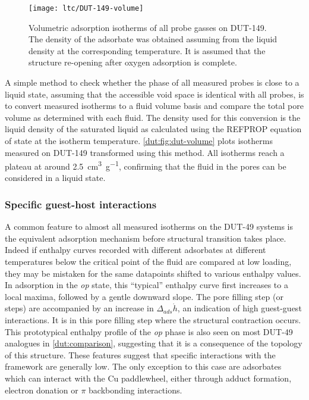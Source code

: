 \begin{figure}[htb]
    \centering
    \texttt{[image: ltc/DUT-149-volume]}%
    \caption{Volumetric adsorption isotherms of all probe gasses
    on DUT-149. The density of the adsorbate was obtained assuming
    from the liquid density at the corresponding temperature.
    It is assumed that the structure re-opening after oxygen
    adsorption is complete.}%
    \label{dut:fig:dut-volume}
\end{figure}

A simple method to check whether the phase of all measured probes
is close to a liquid state, assuming that the accessible void space 
is identical with all probes, is to convert measured isotherms 
to a fluid volume basis and compare the total pore volume as determined
with each fluid. The density used for this conversion is the 
liquid density of the saturated liquid as calculated using the 
REFPROP equation of state at the isotherm temperature.
\autoref{dut:fig:dut-volume} plots isotherms measured on DUT-149
transformed using this method. All isotherms reach a plateau at around 
\SI{2.5}{\centi\metre^3\per\gram}, confirming that the fluid in 
the pores can be considered in a liquid state.

\subsubsection{Specific guest-host interactions}

A common feature to almost all measured isotherms on the DUT-49 systems
is the equivalent adsorption mechanism before structural transition 
takes place.
Indeed if enthalpy curves recorded with different adsorbates at different
temperatures below the critical point of the fluid are compared at low 
loading, they may be mistaken for the same datapoints shifted to
various enthalpy values.
In adsorption in the \textit{op} state, this ``typical'' enthalpy 
curve first increases to a local maxima, followed
by a gentle downward slope. The pore filling step (or steps)
are accompanied by an increase in \(\Delta_{ads} \dot{h}\),
an indication of high guest-guest interactions. It is in this 
pore filling step where the structural contraction occurs. 
This prototypical enthalpy profile of the \textit{op} phase 
is also seen on most DUT-49 analogues
in \autoref{dut:comparison}, suggesting that it is a consequence of 
the topology of this structure.
These features suggest that specific interactions with the framework
are generally low. The only 
exception to this case are adsorbates which can interact with the 
Cu paddlewheel, either through adduct formation, 
electron donation or \(\pi\) backbonding interactions. 

